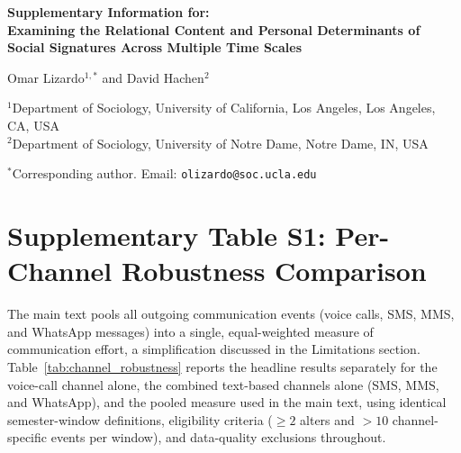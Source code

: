 \documentclass[11pt,letterpaper]{article}
\begin{document}
\begin{center}
{\Large\bfseries Supplementary Information for:\\[0.3em] Examining the Relational Content and Personal Determinants of Social Signatures Across Multiple Time Scales}

\vspace{1.5em}
\large Omar Lizardo$^{1,\ast}$ and David Hachen$^{2}$

\vspace{1em}
\normalsize
$^{1}$Department of Sociology, University of California, Los Angeles, Los Angeles, CA, USA\\
$^{2}$Department of Sociology, University of Notre Dame, Notre Dame, IN, USA

\vspace{1em}
$^{\ast}$Corresponding author. Email: \texttt{olizardo@soc.ucla.edu}
\end{center}
\vspace{1em}

\section*{Supplementary Table S1: Per-Channel Robustness Comparison}

The main text pools all outgoing communication events (voice calls, SMS, MMS, and WhatsApp messages) into a single, equal-weighted measure of communication effort, a simplification discussed in the Limitations section. Table~\ref{tab:channel_robustness} reports the headline results separately for the voice-call channel alone, the combined text-based channels alone (SMS, MMS, and WhatsApp), and the pooled measure used in the main text, using identical semester-window definitions, eligibility criteria ($\ge 2$ alters and $>10$ channel-specific events per window), and data-quality exclusions throughout.
\end{document}
